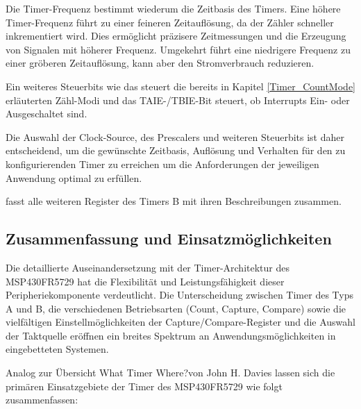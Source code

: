 Die Timer-Frequenz bestimmt wiederum die Zeitbasis des Timers. Eine h\"ohere Timer-Frequenz f\"uhrt zu einer feineren Zeitaufl\"osung, da der Z\"ahler schneller inkrementiert wird. Dies erm\"oglicht pr\"azisere Zeitmessungen und die Erzeugung von Signalen mit h\"oherer Frequenz. Umgekehrt f\"uhrt eine niedrigere Frequenz zu einer gr\"oberen Zeitaufl\"osung, kann aber den Stromverbrauch reduzieren.

Ein weiteres Steuerbits wie das  steuert die bereits in Kapitel \ref{Timer_CountMode} erl\"auterten Z\"ahl-Modi und das TAIE-/TBIE-Bit steuert, ob Interrupts Ein- oder Ausgeschaltet sind.

Die Auswahl der Clock-Source, des Prescalers und weiteren Steuerbits ist daher entscheidend, um die gew\"unschte Zeitbasis, Aufl\"osung und Verhalten f\"ur den zu konfigurierenden Timer zu erreichen um die Anforderungen der jeweiligen Anwendung optimal zu erf\"ullen.

 fasst alle weiteren Register des Timers B mit ihren Beschreibungen zusammen. \AI

\subsection{Zusammenfassung und Einsatzm\"oglichkeiten}
\label{TimerEinsatzmoeglichkeiten}

Die detaillierte Auseinandersetzung mit der Timer-Architektur des MSP430FR5729 hat die Flexibilit\"at und Leistungsf\"ahigkeit dieser Peripheriekomponente verdeutlicht. Die Unterscheidung zwischen Timer des Typs A und B, die verschiedenen Betriebsarten (Count, Capture, Compare) sowie die vielf\"altigen Einstellm\"oglichkeiten der Capture/Compare-Register und die Auswahl der Taktquelle er\"offnen ein breites Spektrum an Anwendungsm\"oglichkeiten in eingebetteten Systemen.

Analog zur \"Ubersicht \grqq What Timer Where?\grqq von John H. Davies lassen sich die prim\"aren Einsatzgebiete der Timer des MSP430FR5729 wie folgt zusammenfassen: 

